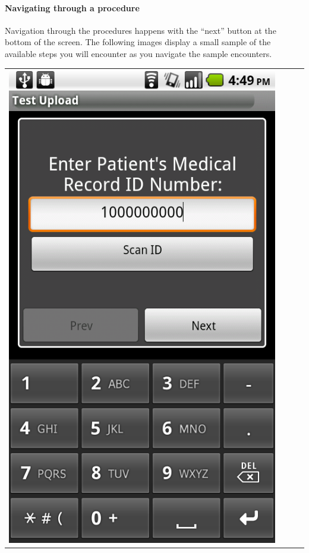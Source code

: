 \documentclass[a4paper,10pt]{article}
\begin{document}
\paragraph{Navigating through a procedure}Navigation through the procedures 
happens with the ``next'' button at the bottom of the screen. The following
images display a small sample of the available steps you will encounter as you
navigate the sample encounters.

\begin{flushleft}
\begin{tabular}{ c c c c }
\includegraphics[scale=0.15,keepaspectratio=true]{client_proc_pt_id.png}

\end{tabular}
\end{flushleft}
\end{document}
